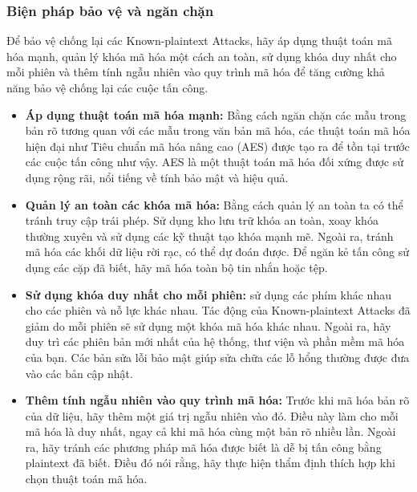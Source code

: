 \subsubsection{Biện pháp bảo vệ và ngăn chặn}
Để bảo vệ chống lại các Known-plaintext Attacks, hãy áp dụng thuật toán mã hóa mạnh, quản lý khóa mã hóa một cách an toàn, sử dụng khóa duy nhất cho mỗi phiên và thêm tính ngẫu nhiên vào quy trình mã hóa để tăng cường khả năng bảo vệ chống lại các cuộc tấn công.
\begin{itemize}
    \item \textbf{Áp dụng thuật toán mã hóa mạnh:} Bằng cách ngăn chặn các mẫu trong bản rõ tương quan với các mẫu trong văn bản mã hóa, các thuật toán mã hóa hiện đại như Tiêu chuẩn mã hóa nâng cao (AES) được tạo ra để tồn tại trước các cuộc tấn công như vậy. AES là một thuật toán mã hóa đối xứng được sử dụng rộng rãi, nổi tiếng về tính bảo mật và hiệu quả.
\item \textbf{Quản lý an toàn các khóa mã hóa:} Bằng cách quản lý an toàn  ta có thể  tránh truy cập trái phép. Sử dụng kho lưu trữ khóa an toàn, xoay khóa thường xuyên và sử dụng các kỹ thuật tạo khóa mạnh mẽ. Ngoài ra, tránh mã hóa các khối dữ liệu rời rạc, có thể dự đoán được. Để ngăn kẻ tấn công sử dụng các cặp đã biết, hãy mã hóa toàn bộ tin nhắn hoặc tệp.
\item \textbf{Sử dụng khóa duy nhất cho mỗi phiên:} sử dụng các phím khác nhau cho các phiên và nỗ lực khác nhau. Tác động của Known-plaintext Attacks đã giảm do mỗi phiên sẽ sử dụng một khóa mã hóa khác nhau. Ngoài ra, hãy duy trì các phiên bản mới nhất của hệ thống, thư viện và phần mềm mã hóa của bạn. Các bản sửa lỗi bảo mật giúp sửa chữa các lỗ hổng thường được đưa vào các bản cập nhật.
\item  \textbf{Thêm tính ngẫu nhiên vào quy trình mã hóa:} Trước khi mã hóa bản rõ của dữ liệu, hãy thêm một giá trị ngẫu nhiên vào đó. Điều này làm cho mỗi mã hóa là duy nhất, ngay cả khi mã hóa cùng một bản rõ nhiều lần. Ngoài ra, hãy tránh các phương pháp mã hóa được biết là dễ bị tấn công bằng plaintext đã biết. Điều đó nói rằng, hãy thực hiện thẩm định thích hợp khi chọn thuật toán mã hóa.

\end{itemize}